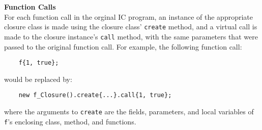 \documentclass{article}
\begin{document}
\textbf{Function Calls}\\
For each function call in the orginal IC program, an instance of the appropriate closure class is made using the closure class' \texttt{create} method, and a virtual call is made to the closure instance's \texttt{call} method, with the same parameters that were passed to the original function call. For example, the following function call:
\begin{verbatim}
    f{1, true};
\end{verbatim}
would be replaced by:
\begin{verbatim}
    new f_Closure().create{...}.call{1, true};
\end{verbatim}
where the arguments to \texttt{create} are the fields, parameters, and local variables of \texttt{f}'s enclosing class, method, and functions.
\end{document}

